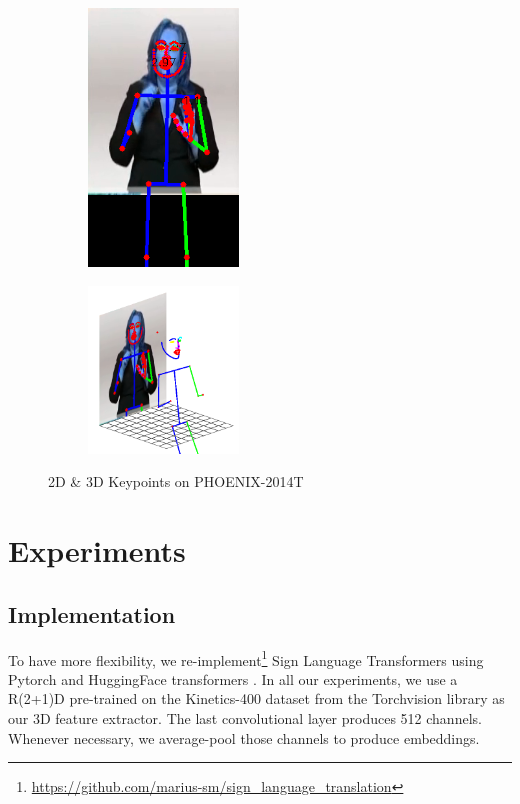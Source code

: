 \documentclass[final]{cvpr}
\begin{document}
\begin{figure}[h]
	\begin{subfigure}[h]{0.5\linewidth}
		\centering
			\includegraphics[width=4cm]{fig/toy_DOPE_v1_0_0_2d.png}
	\end{subfigure}\hfill
	\begin{subfigure}[]{0.5\linewidth}
		\centering
		\includegraphics[width=4cm]{fig/toy_DOPE_v1_0_0_3d.png}
	\end{subfigure}
	\caption{2D \& 3D Keypoints on PHOENIX-2014T}
	\label{fig:2d_3d}
\end{figure}

\section{Experiments}
\subsection{Implementation}

To have more flexibility, we re-implement\footnote{\url{https://github.com/marius-sm/sign_language_translation}} Sign Language Transformers \cite{neccam} using Pytorch and HuggingFace transformers \cite{huggingface}. In all our experiments, we use a R(2+1)D \cite{r2plus1} pre-trained on the Kinetics-400 \cite{kinetics} dataset from the Torchvision library as our 3D feature extractor. The last convolutional layer produces 512 channels. Whenever necessary, we average-pool those channels to produce embeddings.
\end{document}
